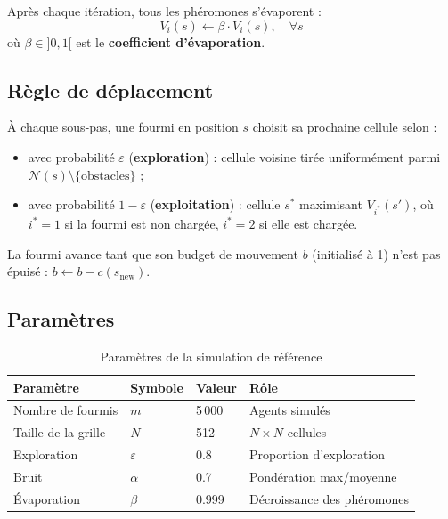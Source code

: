 Après chaque itération, tous les phéromones s'évaporent :
\begin{equation}
    V_i(s) \leftarrow \beta \cdot V_i(s), \quad \forall s
    \label{eq:evaporation}
\end{equation}
où $\beta \in ]0, 1[$ est le \textbf{coefficient d'évaporation}.

\subsection{Règle de déplacement}

À chaque sous-pas, une fourmi en position $s$ choisit sa prochaine cellule selon :
\begin{itemize}
    \item avec probabilité $\varepsilon$ (\textbf{exploration}) : cellule voisine tirée
          uniformément parmi $\mathcal{N}(s) \setminus \{\text{obstacles}\}$ ;
    \item avec probabilité $1 - \varepsilon$ (\textbf{exploitation}) : cellule $s^*$ maximisant
          $V_{i^*}(s')$, où $i^* = 1$ si la fourmi est non chargée, $i^* = 2$ si elle est chargée.
\end{itemize}

La fourmi avance tant que son budget de mouvement $b$ (initialisé à 1) n'est pas épuisé :
$b \leftarrow b - c(s_{\text{new}})$.

\subsection{Paramètres}

\begin{table}[h]
\centering
\caption{Paramètres de la simulation de référence}
\label{tab:params}
\begin{tabular}{llll}
\hline
\textbf{Paramètre} & \textbf{Symbole} & \textbf{Valeur} & \textbf{Rôle} \\
\hline
Nombre de fourmis    & $m$          & 5\,000  & Agents simulés \\
Taille de la grille  & $N$          & 512     & $N \times N$ cellules \\
Exploration          & $\varepsilon$& 0.8     & Proportion d'exploration \\
Bruit                & $\alpha$     & 0.7     & Pondération max/moyenne \\
Évaporation          & $\beta$      & 0.999   & Décroissance des phéromones \\
\hline
\end{tabular}
\end{table}

